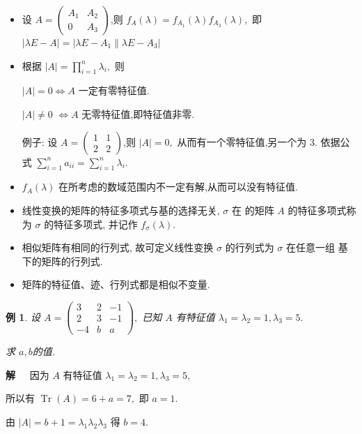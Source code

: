 \documentclass[13pt]{beamer}
\newtheorem{exa}{例}
\def\sol{{\bf 解~~ }}
\begin{document}
\begin{frame}
\begin{itemize}
	\item 设 $A=\left(\begin{array}{cc}A_{1} & A_{2} \\ 0 & A_{3}\end{array}\right)$,则 $f_{A}(\lambda)=f_{A_{1}}(\lambda) f_{A_{3}}(\lambda),$ 即 $|\lambda E-A|=\left|\lambda E-A_{1} \| \lambda E-A_{3}\right|$
	\item 根据 $|A|=\prod_{i=1}^{n} \lambda_{i},$ 则 
	
	$|A|=0 \Leftrightarrow A$ 一定有零特征值.
	
	 $|A| \neq 0$ 	$\Leftrightarrow A$ 无零特征值,即特征值非零.
	 
	 例子: 设 $A=\left(\begin{array}{ll}1 & 1 \\ 2 & 2\end{array}\right)$,则 $|A|=0,$ 从而有一个零特征值,另一个为 $3 .$ 依据公式 $\sum_{i=1}^{n} a_{i i}=\sum_{i=1}^{n} \lambda_{i}$.
	 
	 \item  $f_{A}(\lambda)$ 在所考虑的数域范围内不一定有解,从而可以没有特征值.
\end{itemize}
\end{frame}


\begin{frame}
\begin{itemize}
\item 线性变换的矩阵的特征多项式与基的选择无关, $\sigma$ 在 的矩阵
$A$ 的特征多项式称为 $\sigma$ 的\alert{特征多项式}, 并记作 $f_{\sigma}(\lambda)$.
\item 相似矩阵有相同的行列式, 故可定义线性变换 $\sigma$ 的\alert{行列式}为 $\sigma$ 在任意一组
基下的矩阵的行列式.
\item 矩阵的\alert{特征值}、\alert{迹}、\alert{行列式}都是相似不变量.
\end{itemize}
\end{frame}


\begin{frame}
\begin{exa}
设 $A=\left(\begin{array}{ccc}3 & 2 & -1 \\ 2 & 3 & -1 \\ -4 & b & a\end{array}\right),$ 已知 $A$ 有特征值 $\lambda_{1}=\lambda_{2}=1, \lambda_{3}=5.$ 

求 $a, b$的值.
\end{exa} 
\sol  因为 $A$ 有特征值 $\lambda_{1}=\lambda_{2}=1, \lambda_{3}=5, \quad$ 

所以有 $\operatorname{Tr}(A)=6+a=7,$ 即
$a=1 .$ 

由 $|A|=b+1=\lambda_{1} \lambda_{2} \lambda_{3}$ 得 $b=4$.

\end{frame}
\end{document}
